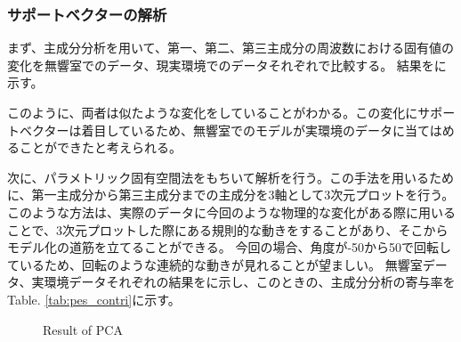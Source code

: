 \subsubsection{サポートベクターの解析}
\label{sec:PCA}
まず、主成分分析を用いて、第一、第二、第三主成分の周波数における固有値の変化を無響室でのデータ、現実環境でのデータそれぞれで比較する。
結果をに示す。

このように、両者は似たような変化をしていることがわかる。この変化にサポートベクターは着目しているため、無響室でのモデルが実環境のデータに当てはめることができたと考えられる。

次に、パラメトリック固有空間法をもちいて解析を行う。この手法を用いるために、第一主成分から第三主成分までの主成分を3軸として3次元プロットを行う。このような方法は、実際のデータに今回のような物理的な変化がある際に用いることで、3次元プロットした際にある規則的な動きをすることがあり、そこからモデル化の道筋を立てることができる。
今回の場合、角度が-50から50で回転しているため、回転のような連続的な動きが見れることが望ましい。
無響室データ、実環境データそれぞれの結果をに示し、このときの、主成分分析の寄与率をTable. \ref{tab:pes_contri}に示す。

\begin{figure}[ht]
    \centering
    \label{fig:pca_check_anechoic}
    \label{fig:pca_check_real}
    \caption{Result of PCA}
    \label{fig:pca_check}
\end{figure}

